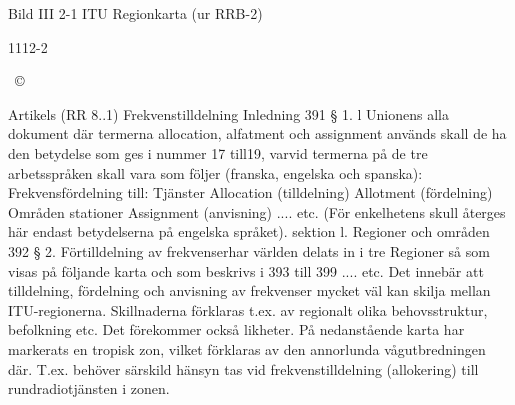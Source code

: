 Bild III 2-1 ITU Regionkarta (ur RRB-2)

1112-2

~©

Artikels (RR 8..1) Frekvenstilldelning
Inledning
391 § 1. l Unionens alla dokument där
termerna allocation, alfatment och assignment används skall de ha den betydelse
som ges i nummer 17 till19, varvid termerna
på de tre arbetsspråken skall vara som följer
(franska, engelska och spanska):
Frekvensfördelning till:
Tjänster
Allocation (tilldelning)
Allotment
(fördelning)
Områden
stationer
Assignment (anvisning) .... etc.
(För enkelhetens skull återges här endast
betydelserna på engelska språket).
sektion l. Regioner och områden
392 § 2. Förtilldelning av frekvenserhar
världen delats in i tre Regioner så som visas
på följande karta och som beskrivs i 393 till
399 .... etc.
Det innebär att tilldelning, fördelning och
anvisning av frekvenser mycket väl kan skilja
mellan ITU-regionerna. Skillnaderna förklaras t.ex. av regionalt olika behovsstruktur,
befolkning etc.
Det förekommer också likheter. På nedanstående karta har markerats en tropisk
zon, vilket förklaras av den annorlunda vågutbredningen där. T.ex. behöver särskild
hänsyn tas vid frekvenstilldelning (allokering) till rundradiotjänsten i zonen.


